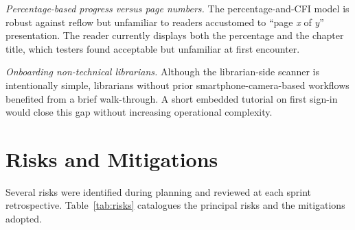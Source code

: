 \documentclass[12pt,a4paper]{report}
\begin{document}
\textit{Percentage-based progress versus page numbers.} The
percentage-and-CFI model is robust against reflow but unfamiliar to
readers accustomed to ``page \textit{x} of \textit{y}'' presentation.
The reader currently displays both the percentage and the chapter
title, which testers found acceptable but unfamiliar at first
encounter.

\textit{Onboarding non-technical librarians.} Although the
librarian-side scanner is intentionally simple, librarians without
prior smartphone-camera-based workflows benefited from a brief
walk-through. A short embedded tutorial on first sign-in would close
this gap without increasing operational complexity.

\section{Risks and Mitigations}

Several risks were identified during planning and reviewed at each
sprint retrospective. Table~\ref{tab:risks} catalogues the principal
risks and the mitigations adopted.
\end{document}
